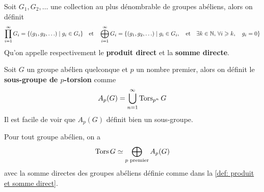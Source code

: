 \begin{definition} \label{def: produit et somme direct}
	Soit $G_1, G_2, \ldots$ une collection au plus dénombrable de groupes abéliens, alors on définit
	\[
	\prod_{i=1}^\infty G_i = \{(g_1, g_2, \ldots) \mid g_i \in G_i\} \quad \text{et} \quad \bigoplus_{i=1}^\infty G_i =  \{ (g_1, g_2, \ldots) \mid g_i \in G_i, \quad \text{et} \quad \exists k \in \mathbb{N}, \, \forall i \geqslant k, \quad g_i = 0\}
	\]
	Qu'on appelle respectivement le \textbf{produit direct} et la \textbf{somme directe}.
\end{definition}

\begin{definition}
	Soit $G$ un groupe abélien quelconque et $p$ un nombre premier, alors on définit le \textbf{sous-groupe de $p$-torsion} comme
	\[
	A_p(G) = \bigcup_{n=1}^\infty \operatorname{Tors}_{p^n} G
	\]
	Il est facile de voir que $A_p(G)$ définit bien un sous-groupe.
\end{definition}

\begin{proposition} \label{prop: Decomposition du groupe de torsion}
	Pour tout groupe abélien, on a 
	\[
	\operatorname{Tors} G \simeq \bigoplus_\text{$p$ premier} A_p(G)
	\]
	avec la somme directes des groupes abéliens définie comme dans la \autoref{def: produit et somme direct}.
\end{proposition}


